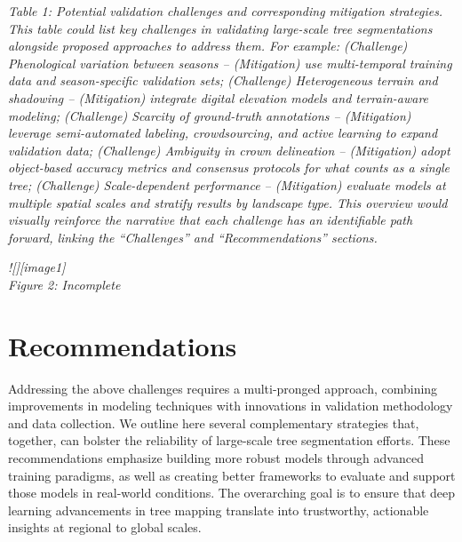 \documentclass[runningheads]{llncs}
\begin{document}
\emph{Table 1: Potential validation challenges and corresponding
mitigation strategies. This table could list key challenges in
validating large-scale tree segmentations alongside proposed approaches
to address them. For example: (Challenge) Phenological variation between
seasons -- (Mitigation) use multi-temporal training data and
season-specific validation sets; (Challenge) Heterogeneous terrain and
shadowing -- (Mitigation) integrate digital elevation models and
terrain-aware modeling; (Challenge) Scarcity of ground-truth annotations
-- (Mitigation) leverage semi-automated labeling, crowdsourcing, and
active learning to expand validation data; (Challenge) Ambiguity in
crown delineation -- (Mitigation) adopt object-based accuracy metrics
and consensus protocols for what counts as a single tree; (Challenge)
Scale-dependent performance -- (Mitigation) evaluate models at multiple
spatial scales and stratify results by landscape type. This overview
would visually reinforce the narrative that each challenge has an
identifiable path forward, linking the ``Challenges'' and
``Recommendations'' sections.}

\emph{!{[}{]}{[}image1{]}}\\
\emph{Figure 2: Incomplete}

\section{Recommendations}\label{recommendations}

Addressing the above challenges requires a multi-pronged approach,
combining improvements in modeling techniques with innovations in
validation methodology and data collection. We outline here several
complementary strategies that, together, can bolster the reliability of
large-scale tree segmentation efforts. These recommendations emphasize
building more robust models through advanced training paradigms, as well
as creating better frameworks to evaluate and support those models in
real-world conditions. The overarching goal is to ensure that deep
learning advancements in tree mapping translate into trustworthy,
actionable insights at regional to global scales.
\end{document}
